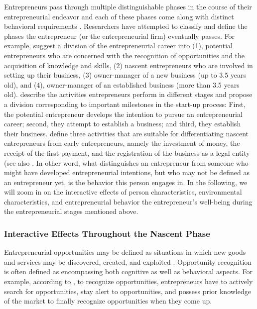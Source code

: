 \documentclass[a4paper,man,natbib]{apa6}
\begin{document}
Entrepreneurs pass through multiple distinguishable phases in the course of their entrepreneurial endeavor and each of these phases come along with distinct behavioral requirements \cite[e.g.][]{Baron.2002, vanGelderen.2005}. Researchers have attempted to classify and define the phases the entrepreneur (or the entrepreneurial firm) eventually passes. For example, \cite{Bosma.2019} suggest a division of the entrepreneurial career into (1), potential entrepreneurs who are concerned with the recognition of opportunities and the acquisition of knowledge and skills, (2) nascent entrepreneurs who are involved in setting up their business, (3) owner-manager of a new business (up to 3.5 years old), and (4), owner-manager of an established business (more than 3.5 years old). \cite{Rotefoss.2005} describe the activities entrepreneurs perform in different stages and propose a division corresponding to important milestones in the start-up process: First, the potential entrepreneur develops the intention to pursue an entrepreneurial career; second, they attempt to establish a business; and third, they establish their business. \cite{Rotefoss.2005} define three activities that are suitable for differentiating nascent entrepreneurs from early entrepreneurs, namely the investment of money, the receipt of the first payment, and the registration of the business as a legal entity (see also \cite{Reynolds.1992}. In other word, what distinguishes an entrepreneur from someone who might have developed entrepreneurial intentions, but who may not be defined as an entrepreneur yet, is the behavior this person engages in. In the following, we will zoom in on the interactive effects of person characteristics, environmental characteristics, and entrepreneurial behavior the entrepreneur's well-being during the entrepreneurial stages mentioned above. 
\subsubsection{Interactive Effects Throughout the Nascent Phase}
Entrepreneurial opportunities may be defined as situations in which new goods and services may be discovered, created, and exploited \citep{Venkataraman.2019}. Opportunity recognition is often defined as encompassing both cognitive as well as behavioral aspects. For example, according to \cite{Baron2006}, to recognize opportunities, entrepreneurs have to actively search for opportunities, stay alert to opportunities, and possess prior knowledge of the market to finally recognize opportunities when they come up. 
\end{document}
